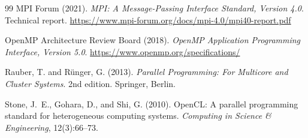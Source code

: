\documentclass[a4paper,12pt]{report}
\begin{document}
\begin{singlespace}
\begin{thebibliography}{99}
MPI Forum (2021).
\textit{MPI: A Message-Passing Interface Standard, Version 4.0}.
Technical report. \url{https://www.mpi-forum.org/docs/mpi-4.0/mpi40-report.pdf}

OpenMP Architecture Review Board (2018).
\textit{OpenMP Application Programming Interface, Version 5.0}.
\url{https://www.openmp.org/specifications/}

Rauber, T. and R\"{u}nger, G. (2013).
\textit{Parallel Programming: For Multicore and Cluster Systems}.
2nd edition. Springer, Berlin.

Stone, J.~E., Gohara, D., and Shi, G. (2010).
OpenCL: A parallel programming standard for heterogeneous computing
systems.
\textit{Computing in Science \& Engineering}, 12(3):66--73.

\end{thebibliography}
\end{singlespace}
\end{document}
